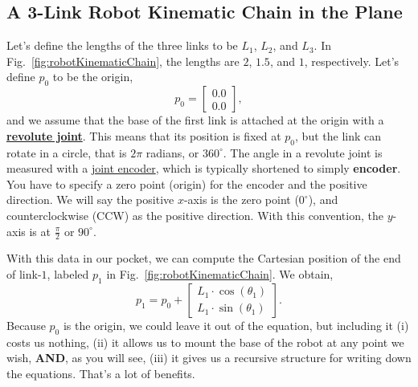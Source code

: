 \subsection{A 3-Link Robot Kinematic Chain in the Plane}
\label{sec:ThreeLinkRobot}

Let's define the lengths of the three links to be $L_1$, $L_2$, and $L_3$. In Fig.~\ref{fig:robotKinematicChain}, the lengths are $2$, $1.5$, and $1$, respectively. Let's define $p_0$ to be the origin, 
$$p_0 = \left[\begin{array}{c} 0.0 \\ 0.0\end{array}\right],$$
and we assume that the base of the first link is attached at the origin with a \href{https://en.wikipedia.org/wiki/Revolute_joint}{\textbf{revolute joint}}. This means that its position is fixed at $p_0$, but the link can rotate in a circle, that is $2 \pi$ radians, or $360^\circ$. The angle in a revolute joint is measured with a \href{https://www.roboticstomorrow.com/article/2016/07/what-is-an-encoder/8553}{joint encoder}, which is typically shortened to simply \textbf{encoder}. You have to specify a zero point (origin) for the encoder and the positive direction. We will say the positive $x$-axis is the zero point ($0^\circ$), and counterclockwise (CCW) as the positive direction. With this convention, the $y$-axis is at $\frac{\pi}{2}$ or $90^\circ$.

With this data in our pocket, we can compute the Cartesian position of the end of link-$1$, labeled $p_1$ in Fig.~\ref{fig:robotKinematicChain}. We obtain,
\begin{equation}
\label{eq:robotp1}
    p_1 = p_0 + \left[\begin{array}{c} L_1 \cdot \cos(\theta_1) \\ L_1 \cdot \sin(\theta_1)\end{array}\right].
\end{equation}
Because $p_0$ is the origin, we could leave it out of the equation, but including it (i) costs us nothing, (ii) it allows us to mount the base of the robot at any point we wish, \textbf{AND}, as you will see, (iii) it gives us a recursive structure for writing down the equations. That's a lot of benefits.

